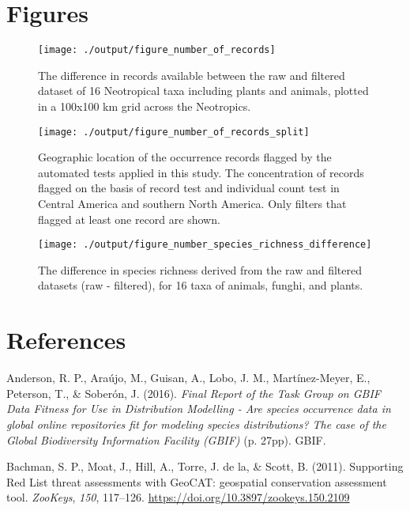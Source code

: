 \documentclass[
  12pt,
]{article}
\begin{document}
\newpage{}

\hypertarget{figures}{%
\section{Figures}\label{figures}}

\begin{figure}
\texttt{[image: ./output/figure\_number\_of\_records]} \caption{The difference in records available between the raw and filtered dataset of 16 Neotropical taxa including plants and animals, plotted in a 100x100 km grid across the Neotropics.}\label{fig:total}
\end{figure}

\begin{figure}
\texttt{[image: ./output/figure\_number\_of\_records\_split]} \caption{Geographic location of the occurrence records flagged by the automated tests  applied in this study. The concentration of records flagged on the basis of record test and individual count test in Central America and southern North America.  Only filters that flagged at least one record are shown.}\label{fig:split}
\end{figure}

\begin{figure}
\texttt{[image: ./output/figure\_number\_species\_richness\_difference]} \caption{The difference in species richness derived from the raw and filtered datasets (raw - filtered), for 16 taxa of animals, funghi, and plants.}\label{fig:speciesrichness}
\end{figure}

\newpage{}

\hypertarget{references}{%
\section*{References}\label{references}}

\hypertarget{refs}{}
\leavevmode\hypertarget{ref-Anderson2016}{}%
Anderson, R. P., Araújo, M., Guisan, A., Lobo, J. M., Martínez-Meyer, E., Peterson, T., \& Soberón, J. (2016). \emph{Final Report of the Task Group on GBIF Data Fitness for Use in Distribution Modelling - Are species occurrence data in global online repositories fit for modeling species distributions? The case of the Global Biodiversity Information Facility (GBIF)} (p. 27pp). GBIF.

\leavevmode\hypertarget{ref-Bachman2011}{}%
Bachman, S. P., Moat, J., Hill, A., Torre, J. de la, \& Scott, B. (2011). Supporting Red List threat assessments with GeoCAT: geospatial conservation assessment tool. \emph{ZooKeys}, \emph{150}, 117--126. \url{https://doi.org/10.3897/zookeys.150.2109}
\end{document}
